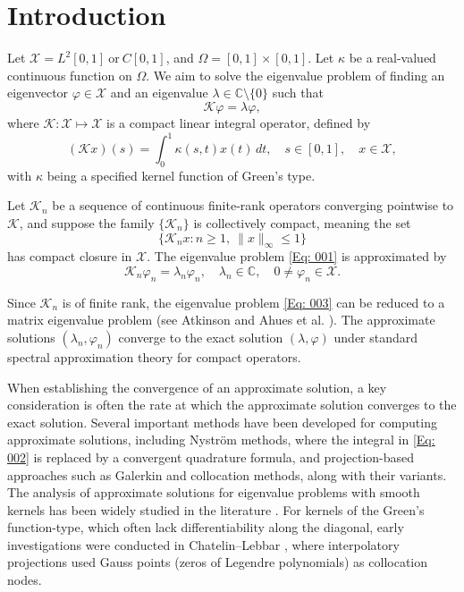 \documentclass[pdflatex, sn-mathphys-num]{sn-jnl}%
\theoremstyle{thmstyleone}%
\theoremstyle{thmstyletwo}%
\theoremstyle{thmstylethree}%
\begin{document}
\setcounter{equation}{0}
\section{Introduction}\label{intro}


Let $\mathcal{X} = L^2[0,1] ~\text{or}~ C[0, 1]$, and $\Omega = [0, 1] \times [0, 1]$.  
Let $\kappa$ be a real-valued continuous function on $\Omega$.  
We aim to solve the eigenvalue problem of finding an eigenvector $\varphi \in \mathcal{X}$ and an eigenvalue $\lambda \in \mathbb{C} \setminus \{0\}$ such that  
\begin{equation} \label{Eq: 001}
	\mathcal{K} \varphi = \lambda \varphi , 
\end{equation}
where $\mathcal{K}: \mathcal{X} \mapsto \mathcal{X}$ is a compact linear integral operator, defined by  
\begin{equation} \label{Eq: 002}
	(\mathcal{K}x)(s) = \int_{0}^{1} \kappa(s, t)x(t) \, dt, \quad s \in [0, 1], \quad x \in \mathcal{X},
\end{equation}
with $\kappa$ being a specified kernel function of Green's type.  

Let $\mathcal{K}_n$ be a sequence of continuous finite-rank operators converging pointwise to $\mathcal{K}$, and suppose the family $\{\mathcal{K}_n\}$ is collectively compact, meaning the set  
\[
\{\mathcal{K}_n x : n \geq 1, \ \|x\|_\infty \leq 1\}
\]
has compact closure in $\mathcal{X}$. The eigenvalue problem \eqref{Eq: 001} is approximated by  
\begin{equation} \label{Eq: 003}
	\mathcal{K}_n \varphi_n = \lambda_n \varphi_n, \quad \lambda_n \in \mathbb{C}, \quad 0 \neq \varphi_n \in \mathcal{X}.
\end{equation}

Since $\mathcal{K}_n$ is of finite rank, the eigenvalue problem \eqref{Eq: 003} can be reduced to a matrix eigenvalue problem (see Atkinson \cite{KEA0} and Ahues et al. \cite{Ahues}). The approximate solutions $(\lambda_n, \varphi_n)$ converge to the exact solution $(\lambda, \varphi)$ under standard spectral approximation theory for compact operators.  

When establishing the convergence of an approximate solution, a key consideration is often the rate at which the approximate solution converges to the exact solution.
Several important methods have been developed for computing approximate solutions, including Nystr\"om methods, where the integral in \eqref{Eq: 002} is replaced by a convergent quadrature formula, and projection-based approaches such as Galerkin and collocation methods, along with their variants. The analysis of approximate solutions for eigenvalue problems with smooth kernels has been widely studied in the literature \cite{Ahues, KEA0, Baker0, Chatelin, Sloan0}. For kernels of the Green's function-type, which often lack differentiability along the diagonal, early investigations were conducted in Chatelin--Lebbar \cite{Cha-Leb2}, where interpolatory projections used Gauss points (zeros of Legendre polynomials) as collocation nodes.  
\end{document}
